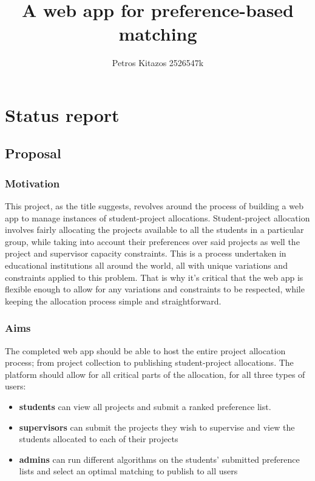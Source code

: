 \documentclass[11pt]{article}
\title{A web app for preference-based matching}
\author{Petros Kitazos 2526547k}
\begin{document}
\maketitle

\section{Status report}

\subsection{Proposal}\label{proposal}

\subsubsection{Motivation}\label{motivation}
This project, as the title suggests, revolves around the process of building a web app to manage instances of student-project allocations. Student-project allocation involves fairly allocating the projects available to all the students in a particular group, while taking into account their preferences over said projects as well the project and supervisor capacity constraints. This is a process undertaken in educational institutions all around the world, all with unique variations and constraints applied to this problem. That is why it's critical that the web app is flexible enough to allow for any variations and constraints to be respected, while keeping the allocation process simple and straightforward.

\subsubsection{Aims}\label{aims}
The completed web app should be able to host the entire project allocation process; from project collection to publishing student-project allocations. The platform should allow for all critical parts of the allocation, for all three types of users:
\begin{itemize}
    \item \textbf{students} can view all projects and submit a ranked preference list.
    \item \textbf{supervisors} can submit the projects they wish to supervise and view the students allocated to each of their projects
    \item \textbf{admins} can run different algorithms on the students' submitted preference lists and select an optimal matching to publish to all users 
\end{itemize}
\end{document}
